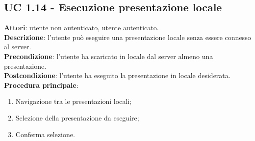 \subsection{UC 1.14 - Esecuzione presentazione locale}{
\label{uc1.14}
	\textbf{Attori}: utente non autenticato, utente autenticato.\\
	\textbf{Descrizione}: l'utente può eseguire una presentazione locale senza essere connesso al server.\\
	\textbf{Precondizione}: l'utente ha scaricato in locale dal server almeno una presentazione.\\
	\textbf{Postcondizione}: l'utente ha eseguito la presentazione in locale desiderata.\\
	\textbf{Procedura principale}:
	\begin{enumerate}
		\item Navigazione tra le presentazioni locali;
		\item Selezione della presentazione da eseguire;
		\item Conferma selezione.
	\end{enumerate}
}